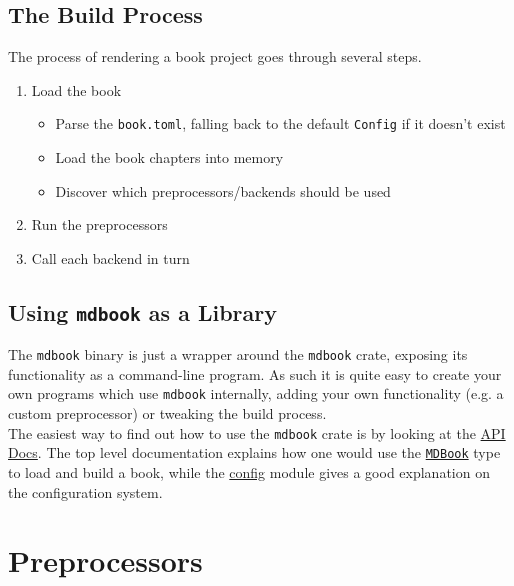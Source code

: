 \documentclass{article}
\begin{document}
\subsection{The Build Process}
\label{The Build Process}
\label{the-build-process}

The process of rendering a book project goes through several steps.\\
\begin{enumerate}
\item Load the book\begin{itemize}
\item Parse the \lstinline|book.toml|, falling back to the default \lstinline|Config| if it doesn't
exist
\item Load the book chapters into memory
\item Discover which preprocessors/backends should be used
\end{itemize}

\item Run the preprocessors
\item Call each backend in turn
\end{enumerate}

\subsection{Using \lstinline|mdbook| as a Library}
\label{ as a Library}
\label{as-a-library}

The \lstinline|mdbook| binary is just a wrapper around the \lstinline|mdbook| crate, exposing its
functionality as a command-line program. As such it is quite easy to create your
own programs which use \lstinline|mdbook| internally, adding your own functionality (e.g.
a custom preprocessor) or tweaking the build process.\\

The easiest way to find out how to use the \lstinline|mdbook| crate is by looking at the
\href{https://docs.rs/mdbook/*/mdbook/}{API Docs}. The top level documentation explains how one would use the
\href{https://docs.rs/mdbook/*/mdbook/book/struct.MDBook.html}{\lstinline|MDBook|} type to load and build a book, while the \href{https://docs.rs/mdbook/*/mdbook/config/index.html}{config} module gives a good
explanation on the configuration system.\\

\section{Preprocessors}
\label{Preprocessors}
\label{preprocessors}
\end{document}
